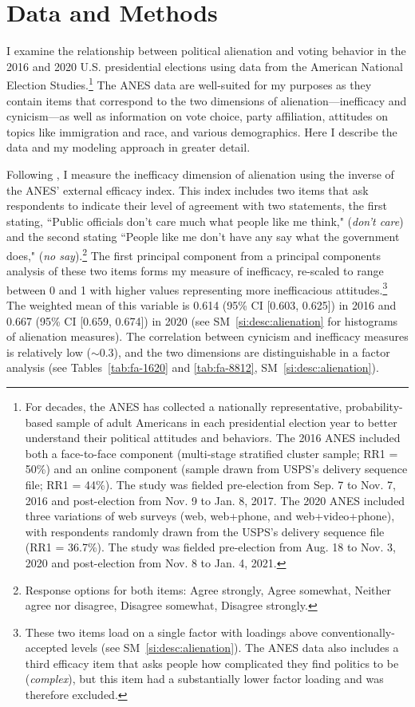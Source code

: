 \documentclass[12pt]{article}
\begin{document}
\section*{Data and Methods}\label{sec:datamethods}
I examine the relationship between political alienation and voting behavior in the 2016 and 2020 U.S. presidential elections using data from the American National Election Studies.\footnote{For decades, the ANES has collected a nationally representative, probability-based sample of adult Americans in each presidential election year to better understand their political attitudes and behaviors. The 2016 ANES included both a face-to-face component (multi-stage stratified cluster sample; RR1 = 50\%) and an online component (sample drawn from USPS's delivery sequence file; RR1 = 44\%). The study was fielded pre-election from Sep. 7 to Nov. 7, 2016 and post-election from Nov. 9 to Jan. 8, 2017. The 2020 ANES included three variations of web surveys (web, web+phone, and web+video+phone), with respondents randomly drawn from the USPS's delivery sequence file (RR1 = 36.7\%). The study was fielded pre-election from Aug. 18 to Nov. 3, 2020 and post-election from Nov. 8 to Jan. 4, 2021.} The ANES data are well-suited for my purposes as they contain items that correspond to the two dimensions of alienation---inefficacy and cynicism---as well as information on vote choice, party affiliation, attitudes on topics like immigration and race, and various demographics. Here I describe the data and my modeling approach in greater detail.

Following \textcite{mason1985on}, I measure the inefficacy dimension of alienation using the inverse of the ANES' external efficacy index. This index includes two items that ask respondents to indicate their level of agreement with two statements, the first stating, ``Public officials don't care much what people like me think," (\textit{don't care}) and the second stating ``People like me don't have any say what the government does," (\textit{no say}).\footnote{Response options for both items: Agree strongly, Agree somewhat, Neither agree nor disagree, Disagree somewhat, Disagree strongly.} The first principal component from a principal components analysis of these two items forms my measure of inefficacy, re-scaled to range between 0 and 1 with higher values representing more inefficacious attitudes.\footnote{These two items load on a single factor with loadings above conventionally-accepted levels (see SM~\ref{si:desc:alienation}). The ANES data also includes a third efficacy item that asks people how complicated they find politics to be (\textit{complex}), but this item had a substantially lower factor loading and was therefore excluded.} The weighted mean of this variable is 0.614 (95\% CI [0.603, 0.625]) in 2016 and 0.667 (95\% CI [0.659, 0.674]) in 2020 (see SM~\ref{si:desc:alienation} for histograms of alienation measures). The correlation between cynicism and inefficacy measures is relatively low ($\sim$0.3), and the two dimensions are distinguishable in a factor analysis (see Tables~\ref{tab:fa-1620} and \ref{tab:fa-8812}, SM~\ref{si:desc:alienation}). 
\end{document}
